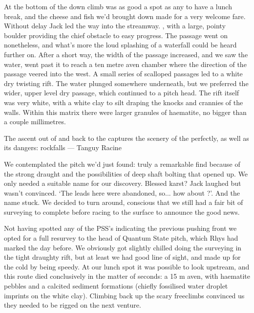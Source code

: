 At the bottom of the down climb was as good a spot as any to have a lunch break, and the cheese and fish we'd brought down made for a very welcome fare. Without delay Jack led the way into the streamway. , with a large, pointy boulder providing the chief obstacle to easy progress. The passage went on nonetheless, and what's more the loud splashing of a waterfall could be heard further on. After a short way, the width of the passage increased, and we saw the water, went past it to reach a ten metre aven chamber where the direction of the passage veered into the west. A small series of scalloped passages led to a white dry twisting rift. The water plunged somewhere underneath, but we preferred the wider, upper level dry passage, which continued to a pitch head. The rift itself was very white, with a white clay to silt draping the knocks and crannies of the walls. Within this matrix there were larger granules of haematite, no bigger than a couple millimetres. 

\begin{marginfigure}
\centering
{}
\caption{The ascent out of  and back to the  captures the scenery of the  perfectly, as well as its dangers: rockfalls --- Tanguy Racine}
\label{fig:western cliffs}
\end{marginfigure}

We contemplated the pitch we'd just found: truly a remarkable find because of the strong draught and the possibilities of deep shaft bolting that opened up. We only needed a suitable name for our discovery. Blessed karst? Jack laughed but wasn't convinced. `The leads here were abandoned, so... how about ?'. And the name stuck. We decided to turn around, conscious that we still had a fair bit of surveying to complete before racing to the surface to announce the good news. 


Not having spotted any of the PSS's indicating the previous pushing front we opted for a full resurvey to the head of Quantum State pitch, which Rhys had marked the day before. We obviously got slightly chilled doing the surveying in the tight draughty rift, but at least we had good line of sight, and made up for the cold by being speedy. At our lunch spot it was possible to look upstream, and this route died conclusively in the matter of seconds: a 15 m aven, with haematite pebbles and a calcited sediment formations (chiefly fossilised water droplet imprints on the white clay). Climbing back up the scary freeclimbs convinced us they needed to be rigged on the next venture. 

